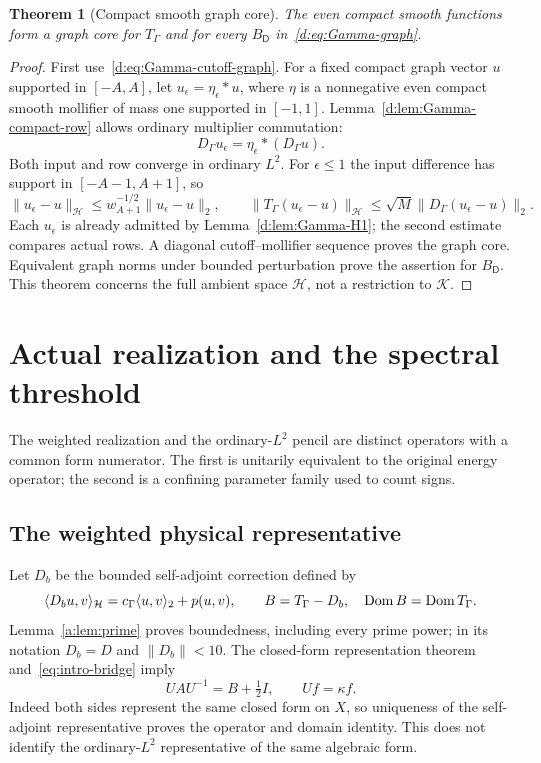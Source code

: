 \documentclass[11pt,a4paper]{article}
\numberwithin{equation}{section}
\newtheorem{theorem}{Theorem}[section]
\theoremstyle{definition}\newtheorem{definition}[theorem]{Definition}
\theoremstyle{remark}\newtheorem{remark}[theorem]{Remark}
\newcommand{\Hh}{\mathcal H}\newcommand{\Hw}{\mathcal H}
\newcommand{\dom}{\operatorname{Dom}}\newcommand{\Var}{\operatorname{Var}}
\newcommand{\ip}[2]{\langle#1,#2\rangle}\newcommand{\norm}[1]{\lVert#1\rVert}\newcommand{\abs}[1]{\lvert#1\rvert}
\newcommand{\Kk}{\mathcal K}\newcommand{\Aa}{\mathcal A}\newcommand{\Ff}{\mathcal F}
\begin{document}
\begin{theorem}[Compact smooth graph core]\label{d:thm:Gamma-graph-core}
The even compact smooth functions form a graph core for $T_\Gamma$ and for every $B_{\mathsf D}$ in~\eqref{d:eq:Gamma-graph}.
\end{theorem}
\begin{proof}
First use~\eqref{d:eq:Gamma-cutoff-graph}. For a fixed compact graph vector $u$ supported in $[-A,A]$, let $u_\epsilon=\eta_\epsilon*u$, where $\eta$ is a nonnegative even compact smooth mollifier of mass one supported in $[-1,1]$. Lemma~\ref{d:lem:Gamma-compact-row} allows ordinary multiplier commutation:
\[
 D_\Gamma u_\epsilon=\eta_\epsilon*(D_\Gamma u).
\]
Both input and row converge in ordinary $L^2$. For $\epsilon\le1$ the input difference has support in $[-A-1,A+1]$, so
\[
 \norm{u_\epsilon-u}_{\Hh}
 \le w_{A+1}^{-1/2}\norm{u_\epsilon-u}_2,\qquad
 \norm{T_\Gamma(u_\epsilon-u)}_{\Hh}
 \le\sqrt M\norm{D_\Gamma(u_\epsilon-u)}_2.
\]
Each $u_\epsilon$ is already admitted by Lemma~\ref{d:lem:Gamma-H1}; the second estimate compares actual rows. A diagonal cutoff--mollifier sequence proves the graph core. Equivalent graph norms under bounded perturbation prove the assertion for $B_{\mathsf D}$. This theorem concerns the full ambient space $\Hh$, not a restriction to $\Kk$.
\end{proof}


\section{Actual realization and the spectral threshold}\label{sec:spectral}
The weighted realization and the ordinary-$L^2$ pencil are distinct operators with a common form numerator. The first is unitarily equivalent to the original energy operator; the second is a confining parameter family used to count signs.


\subsection{The weighted physical representative}\label{sec:weighted-physical}
Let $D_b$ be the bounded self-adjoint correction defined by
\begin{equation}\label{eq:Db-physical}
 \ip{D_bu}{v}_{\Hh}=\cg\ip uv_2+p(u,v),\qquad
 B=T_\Gamma-D_b,\quad \dom B=\dom T_\Gamma.
\end{equation}
Lemma~\ref{a:lem:prime} proves boundedness, including every prime power; in its notation $D_b=D$ and $\norm{D_b}<10$. The closed-form representation theorem and~\eqref{eq:intro-bridge} imply
\begin{equation}\label{eq:actual-unitary}
 UAU^{-1}=B+\tfrac12I,\qquad Uf=\kappa f.
\end{equation}
Indeed both sides represent the same closed form on $X$, so uniqueness of the self-adjoint representative proves the operator and domain identity. This does not identify the ordinary-$L^2$ representative of the same algebraic form.
\end{document}
